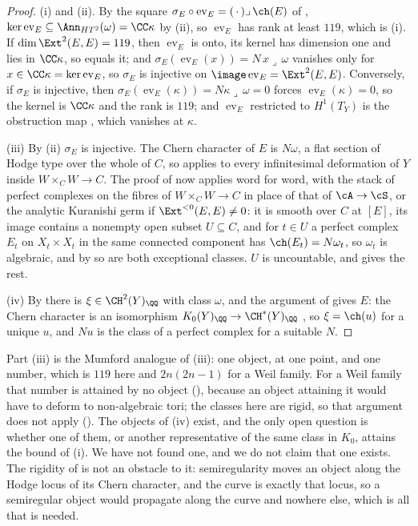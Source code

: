 \begin{proof}
(i) and (ii). By the square $\sigma_{E}\circ\operatorname{ev}_{E}=
(\,\cdot\,)\lrcorner\,\ch(E)$ of , $\ker
\operatorname{ev}_{E}\subseteq\Ann_{HT^{2}}(\omega)=\CC\kappa$ by
(ii), so $\operatorname{ev}_{E}$ has rank at least
$119$, which is (i). If $\dim\Ext^{2}(E,E)=119$, then
$\operatorname{ev}_{E}$ is onto, its kernel has dimension one and lies in
$\CC\kappa$, so equals it; and $\sigma_{E}(\operatorname{ev}_{E}(x))=
N\,x\lrcorner\,\omega$ vanishes only for $x\in\CC\kappa=\ker
\operatorname{ev}_{E}$, so $\sigma_{E}$ is injective on
$\image\operatorname{ev}_{E}=\Ext^{2}(E,E)$. Conversely, if $\sigma_{E}$ is
injective, then $\sigma_{E}(\operatorname{ev}_{E}(\kappa))=N\kappa\lrcorner
\,\omega=0$ forces $\operatorname{ev}_{E}(\kappa)=0$, so the kernel is
$\CC\kappa$ and the rank is $119$; and $\operatorname{ev}_{E}$ restricted to
$H^{1}(T_{Y})$ is the obstruction map \cite{Tod09}, which vanishes at
$\kappa$.

(iii) By (ii) $\sigma_{E}$ is injective. The Chern character of $E$ is
$N\omega$, a flat section of Hodge type over the whole of $C$, so
 applies to every infinitesimal deformation of $Y$ inside
$W\times_{C}W\to C$. The proof of  now applies word
for word, with the stack of perfect complexes on the fibres of $W\times_{C}
W\to C$ \cite{Lie06} in place of that of $\cA\to\cS$, or the analytic
Kuranishi germ if $\Ext^{<0}(E,E)\ne0$: it is smooth over $C$ at $[E]$, its
image contains a nonempty open subset $U\subseteq C$, and for $t\in U$ a
perfect complex $E_{t}$ on $X_{t}\times
X_{t}$ in the same connected component has $\ch(E_{t})=N\omega_{t}$, so
$\omega_{t}$ is algebraic, and by  so are both
exceptional classes. $U$ is uncountable, and  gives
the rest.

(iv) By  there is $\xi\in\CH^{2}(Y)_{\QQ}$ with class
$\omega$, and the argument of  gives $E$: the Chern
character is an isomorphism $K_{0}(Y)_{\QQ}\to\CH^{*}(Y)_{\QQ}$
\cite[Ex.~15.2.16(b) and Cor.~18.3.2]{Ful98}, so $\xi=\ch(u)$ for a unique
$u$, and $Nu$ is the class of a perfect complex for a suitable $N$.
\end{proof}

Part (iii) is the Mumford analogue of (iii): one object,
at one point, and one number, which is $119$ here and $2n(2n-1)$ for a Weil
family. For a Weil family that number is attained by no object
(), because an object attaining it would have to deform to
non-algebraic tori; the classes here are rigid, so that argument does not
apply (). The objects of (iv) exist, and the only open question is whether one
of them, or another representative of the same class in $K_{0}$, attains the
bound of (i). We have not found one, and we do not claim that one exists. The
rigidity of  is not an obstacle to it: semiregularity
moves an object along the Hodge locus of its Chern character, and the curve
is exactly that locus, so a semiregular object would propagate along the
curve and nowhere else, which is all that is needed.


